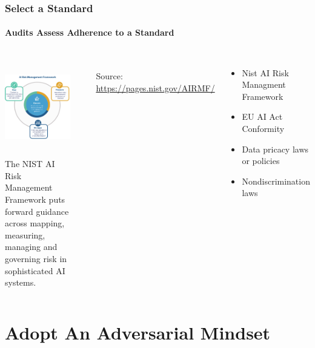 \documentclass[11pt,
               aspectratio=169,
               hyperref={colorlinks}
               ]{beamer}
\begin{document}
			\begin{frame}
				
				\frametitle{Select a Standard}
				\framesubtitle{Audits Assess Adherence to a Standard}		
				
				\begin{columns}
					
					\centering
					\includegraphics[height=120pt]{../img/NIST_RMF_img1.png}\\
					\scriptsize{The NIST AI Risk Management Framework puts forward guidance across mapping, measuring, managing and governing risk in sophisticated AI systems.}
					
					\par\noindent\rule{100pt}{0.4pt}\\
					\vspace{5pt}
					\scriptsize{\tiny{Source: \url{https://pages.nist.gov/AIRMF/}}}
					
					\vspace{-5pt}
					\begin{itemize}
						\item Nist AI Risk Managment Framework
						\item EU AI Act Conformity
						\item Data pricacy laws or policies
						\item Nondiscrimination laws
					\end{itemize}
				\end{columns}

			\end{frame}


	\section{Adopt An Adversarial Mindset}
\end{document}
